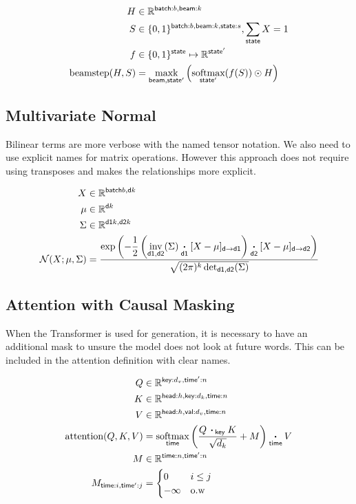 \documentclass{article}
\newcommand{\name}[1]{\mathsf{#1}}
\newcommand{\ndot}[1]{\mathbin{\mathop{\thinspace\boldsymbol\cdot\thinspace}\displaylimits_{\name{#1}}}}
\newcommand{\nsum}[1]{\mathop{\sum}_{\name{#1}}}
\newcommand{\nfun}[2]{\mathop{\text{#2}}\displaylimits_{\name{#1}}}
\newcommand{\reals}{\mathbb{R}}
\begin{document}
\begin{align*} 
H &\in \reals^{{ \name{batch}:b, \name{beam}:k}} \\
S &\in \{0, 1\}^{{ \name{batch}:b, \name{beam}:k, \name{state}:s}}, \nsum{state} X = 1\\
f &\in \{0, 1\}^{{\name{state}}} \mapsto \reals^{{\name{state'}}} \\ 
\text{beamstep}(H, S) &=  \nfun{beam, state'}{maxk} \left( \nfun{state'}{softmax}(f(S)) \odot H  \right)
\end{align*} 

\subsection{Multivariate Normal}

Bilinear terms are more verbose with the named tensor notation. We
also need to use explicit names for matrix operations.  However this
approach does not require using transposes and makes the relationships more explicit.

\begin{align*} 
X &\in \reals^{\name{batch}{b}, \name{d}{k}}  \\
\mu &\in \reals^{{\name{d}{k}}}  \\
\Sigma & \in   \reals^{{\name{d1}{k}, \name{d2}{k}}}  \\
{\cal N}(X; \mu, \Sigma) &= \frac{\displaystyle \exp\left(-\frac{1}{2}  \left(\nfun{d1, d2}{inv}(\Sigma) \ndot{d1} [X - \mu]_{\name{d} \rightarrow \name{d1}} \right) \ndot{d2} [X - \mu]_{\name{d} \rightarrow \name{d2}} \right) }{\sqrt{(2 \pi)^k \nfun{d1, d2}{det}(\Sigma)} }
\end{align*}


\subsection{Attention with Causal Masking}

When the Transformer is used for generation, it is necessary to have
an additional mask to unsure the model does not look at future words.
This can be included in the attention definition with clear names.

\begin{align*} 
Q &\in \reals^{\name{key}:d_v,\name{time'}:n}\\
K &\in \reals^{\name{head}:h,\name{key}:d_k, \name{time}:n}\\
V &\in \reals^{\name{head}:h, \name{val}:d_v, \name{time}:n}\\
\text{attention}(Q, K, V) &=  \nfun{time}{softmax} \left( \frac{Q \ndot{key} K }{\sqrt{d_k}} + M \right) \ndot{time} V \\
M & \in \reals^{\name{time}:n, \name{time'}:n} \\
M_{\name{time}:i, \name{time'}:j} & = \begin{cases}0 & i \leq j\\
-\infty & \text{o.w} \end{cases} \\
\end{align*}
\end{document}
